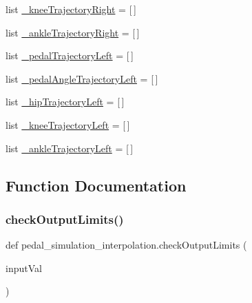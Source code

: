 \begin{DoxyCompactItemize}
\item 
list \mbox{\hyperlink{namespacepedal__simulation__interpolation_a68c1a3d9c021d1ae2016fe4e23efec03}{\+\_\+knee\+Trajectory\+Right}} = \mbox{[}$\,$\mbox{]}
\item 
list \mbox{\hyperlink{namespacepedal__simulation__interpolation_af80e1e0da5ea43eb6594a5542422df25}{\+\_\+ankle\+Trajectory\+Right}} = \mbox{[}$\,$\mbox{]}
\item 
list \mbox{\hyperlink{namespacepedal__simulation__interpolation_a1e178cb29cda95f16b1adb840547c8d8}{\+\_\+pedal\+Trajectory\+Left}} = \mbox{[}$\,$\mbox{]}
\item 
list \mbox{\hyperlink{namespacepedal__simulation__interpolation_aa89711c351dfbb29b8e11a2f9a68e8c7}{\+\_\+pedal\+Angle\+Trajectory\+Left}} = \mbox{[}$\,$\mbox{]}
\item 
list \mbox{\hyperlink{namespacepedal__simulation__interpolation_a1198ef17eb63dd04ae662cfc4a67e113}{\+\_\+hip\+Trajectory\+Left}} = \mbox{[}$\,$\mbox{]}
\item 
list \mbox{\hyperlink{namespacepedal__simulation__interpolation_a1ced78c2d77206ad99b3479640a50650}{\+\_\+knee\+Trajectory\+Left}} = \mbox{[}$\,$\mbox{]}
\item 
list \mbox{\hyperlink{namespacepedal__simulation__interpolation_a58713ef2878a5c365588f1706c86235f}{\+\_\+ankle\+Trajectory\+Left}} = \mbox{[}$\,$\mbox{]}
\end{DoxyCompactItemize}


\subsection{Function Documentation}
\mbox{\label{namespacepedal__simulation__interpolation_ac12e75a6f9f23addd42552ffff096c24}} 
\subsubsection{\texorpdfstring{checkOutputLimits()}{checkOutputLimits()}}
{\footnotesize\ttfamily def pedal\+\_\+simulation\+\_\+interpolation.\+check\+Output\+Limits (\begin{DoxyParamCaption}\item[{}]{input\+Val }\end{DoxyParamCaption})}



